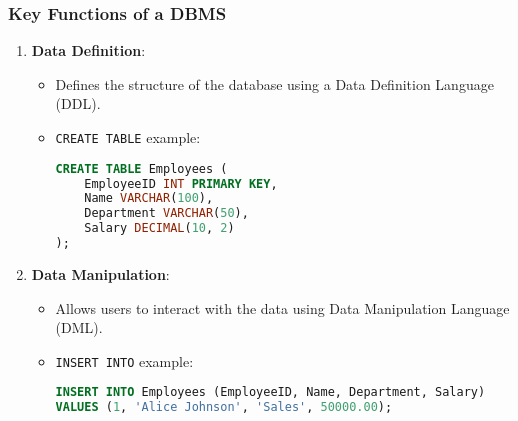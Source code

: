 \documentclass[aspectratio=169]{beamer}
\begin{document}
\begin{frame}[fragile]
    \frametitle{Key Functions of a DBMS}
    \begin{enumerate}
        \item \textbf{Data Definition}:
        \begin{itemize}
            \item Defines the structure of the database using a Data Definition Language (DDL).
            \item \texttt{CREATE TABLE} example:
            \begin{lstlisting}[language=SQL]
CREATE TABLE Employees (
    EmployeeID INT PRIMARY KEY,
    Name VARCHAR(100),
    Department VARCHAR(50),
    Salary DECIMAL(10, 2)
);
            \end{lstlisting}
        \end{itemize}
        
        \item \textbf{Data Manipulation}:
        \begin{itemize}
            \item Allows users to interact with the data using Data Manipulation Language (DML).
            \item \texttt{INSERT INTO} example:
            \begin{lstlisting}[language=SQL]
INSERT INTO Employees (EmployeeID, Name, Department, Salary)
VALUES (1, 'Alice Johnson', 'Sales', 50000.00);
            \end{lstlisting}
        \end{itemize}
    \end{enumerate}
\end{frame}
\end{document}
